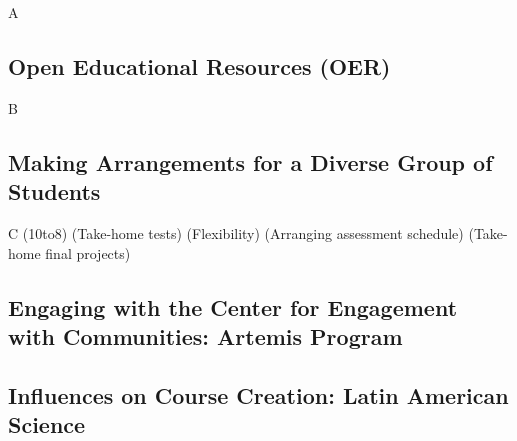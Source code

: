 \documentclass[../../../main.tex]{subfiles}
\begin{document}
A

\subsection{Open Educational Resources (OER)}

B

\subsection{Making Arrangements for a Diverse Group of Students}

C (10to8) (Take-home tests) (Flexibility) (Arranging assessment schedule) (Take-home final projects)

\subsection{Engaging with the Center for Engagement with Communities: Artemis Program}

\subsection{Influences on Course Creation: Latin American Science}
\end{document}
